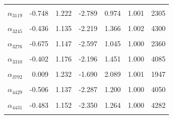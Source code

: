 \begin{longtable}{lrrrrrr}
\cellcolor{gray!10}{$\alpha_{3118}$} & \cellcolor{gray!10}{-0.750} & \cellcolor{gray!10}{1.213} & \cellcolor{gray!10}{-2.782} & \cellcolor{gray!10}{0.999} & \cellcolor{gray!10}{1.002} & \cellcolor{gray!10}{2332}\\
$\alpha_{3119}$ & -0.748 & 1.222 & -2.789 & 0.974 & 1.001 & 2305\\
\cellcolor{gray!10}{$\alpha_{3120}$} & \cellcolor{gray!10}{-0.155} & \cellcolor{gray!10}{1.154} & \cellcolor{gray!10}{-1.824} & \cellcolor{gray!10}{1.715} & \cellcolor{gray!10}{1.001} & \cellcolor{gray!10}{3012}\\
$\alpha_{3245}$ & -0.436 & 1.135 & -2.219 & 1.366 & 1.002 & 4300\\
\cellcolor{gray!10}{$\alpha_{3255}$} & \cellcolor{gray!10}{-0.441} & \cellcolor{gray!10}{1.150} & \cellcolor{gray!10}{-2.334} & \cellcolor{gray!10}{1.331} & \cellcolor{gray!10}{1.002} & \cellcolor{gray!10}{4347}\\
$\alpha_{3276}$ & -0.675 & 1.147 & -2.597 & 1.045 & 1.000 & 2360\\
\cellcolor{gray!10}{$\alpha_{3303}$} & \cellcolor{gray!10}{-0.456} & \cellcolor{gray!10}{1.137} & \cellcolor{gray!10}{-2.221} & \cellcolor{gray!10}{1.280} & \cellcolor{gray!10}{1.002} & \cellcolor{gray!10}{4284}\\
$\alpha_{3310}$ & -0.402 & 1.176 & -2.196 & 1.451 & 1.000 & 4085\\
\cellcolor{gray!10}{$\alpha_{3333}$} & \cellcolor{gray!10}{-0.390} & \cellcolor{gray!10}{1.204} & \cellcolor{gray!10}{-2.197} & \cellcolor{gray!10}{1.450} & \cellcolor{gray!10}{1.001} & \cellcolor{gray!10}{4663}\\
$\alpha_{3792}$ & 0.009 & 1.232 & -1.690 & 2.089 & 1.001 & 1947\\
\cellcolor{gray!10}{$\alpha_{4281}$} & \cellcolor{gray!10}{-0.477} & \cellcolor{gray!10}{1.161} & \cellcolor{gray!10}{-2.296} & \cellcolor{gray!10}{1.317} & \cellcolor{gray!10}{1.001} & \cellcolor{gray!10}{4029}\\
$\alpha_{4429}$ & -0.506 & 1.137 & -2.287 & 1.200 & 1.000 & 4050\\
\cellcolor{gray!10}{$\alpha_{4430}$} & \cellcolor{gray!10}{-0.465} & \cellcolor{gray!10}{1.176} & \cellcolor{gray!10}{-2.318} & \cellcolor{gray!10}{1.317} & \cellcolor{gray!10}{1.000} & \cellcolor{gray!10}{4086}\\
$\alpha_{4431}$ & -0.483 & 1.152 & -2.350 & 1.264 & 1.000 & 4282\\
\cellcolor{gray!10}{$\alpha_{4448}$} & \cellcolor{gray!10}{-0.479} & \cellcolor{gray!10}{1.133} & \cellcolor{gray!10}{-2.236} & \cellcolor{gray!10}{1.204} & \cellcolor{gray!10}{1.000} & \cellcolor{gray!10}{3829}\\

\end{longtable}

